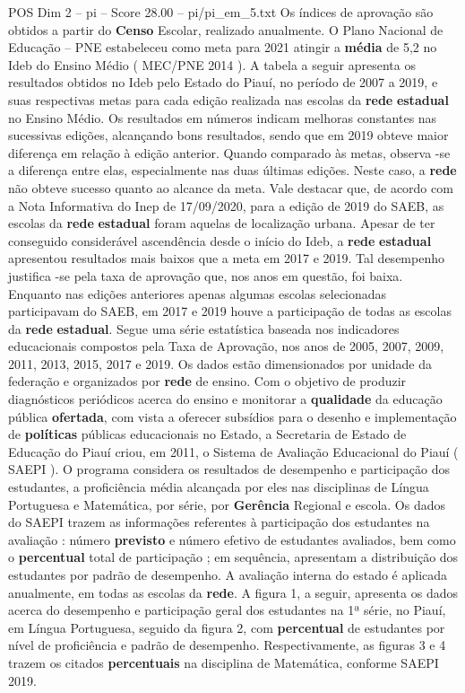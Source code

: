 \begin{textsample}{POS Dim 2 – pi – Score 28.00 – pi/pi\_em\_5.txt}
Os índices de aprovação são obtidos a partir do \textbf{Censo} Escolar, realizado anualmente.
O Plano Nacional de Educação – PNE estabeleceu como meta para 2021 atingir a \textbf{média} de 5,2 no Ideb do Ensino Médio ( MEC/PNE 2014 ).
A tabela a seguir apresenta os resultados obtidos no Ideb pelo Estado do Piauí, no período de 2007 a 2019, e suas respectivas metas para cada edição realizada nas escolas da \textbf{rede} \textbf{estadual} no Ensino Médio.
Os resultados em números indicam melhoras constantes nas sucessivas edições, alcançando bons resultados, sendo que em 2019 obteve maior diferença em relação à edição anterior.
Quando comparado às metas, observa -se a diferença entre elas, especialmente nas duas últimas edições.
Neste caso, a \textbf{rede} não obteve sucesso quanto ao alcance da meta.
Vale destacar que, de acordo com a Nota Informativa do Inep de 17/09/2020, para a edição de 2019 do SAEB, as escolas da \textbf{rede} \textbf{estadual} foram aquelas de localização urbana.
Apesar de ter conseguido considerável ascendência desde o início do Ideb, a \textbf{rede} \textbf{estadual} apresentou resultados mais baixos que a meta em 2017 e 2019.
Tal desempenho justifica -se pela taxa de aprovação que, nos anos em questão, foi baixa.
Enquanto nas edições anteriores apenas algumas escolas selecionadas participavam do SAEB, em 2017 e 2019 houve a participação de todas as escolas da \textbf{rede} \textbf{estadual}.
Segue uma série estatística baseada nos indicadores educacionais compostos pela Taxa de Aprovação, nos anos de 2005, 2007, 2009, 2011, 2013, 2015, 2017 e 2019.
Os dados estão dimensionados por unidade da federação e organizados por \textbf{rede} de ensino.
Com o objetivo de produzir diagnósticos periódicos acerca do ensino e monitorar a \textbf{qualidade} da educação pública \textbf{ofertada}, com vista a oferecer subsídios para o desenho e implementação de \textbf{políticas} públicas educacionais no Estado, a Secretaria de Estado de Educação do Piauí criou, em 2011, o Sistema de Avaliação Educacional do Piauí ( SAEPI ).
O programa considera os resultados de desempenho e participação dos estudantes, a proficiência média alcançada por eles nas disciplinas de Língua Portuguesa e Matemática, por série, por \textbf{Gerência} Regional e escola.
Os dados do SAEPI trazem as informações referentes à participação dos estudantes na avaliação : número \textbf{previsto} e número efetivo de estudantes avaliados, bem como o \textbf{percentual} total de participação ; em sequência, apresentam a distribuição dos estudantes por padrão de desempenho.
A avaliação interna do estado é aplicada anualmente, em todas as escolas da \textbf{rede}.
A figura 1, a seguir, apresenta os dados acerca do desempenho e participação geral dos estudantes na 1ª série, no Piauí, em Língua Portuguesa, seguido da figura 2, com \textbf{percentual} de estudantes por nível de proficiência e padrão de desempenho.
Respectivamente, as figuras 3 e 4 trazem os citados \textbf{percentuais} na disciplina de Matemática, conforme SAEPI 2019.


\end{textsample}
